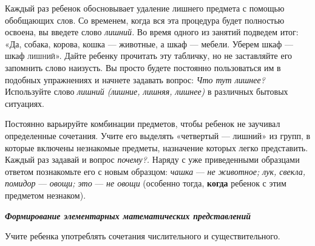 \documentclass[a5paper]{book}
\renewcommand{\emph}[1]{\textit{#1}}
\begin{document}
Каждый раз ребенок обосновывает удаление лишнего предмета с помощью
обобщающих слов. Со временем, когда вся эта процедура будет полностью
освоена, вы введете слово \emph{лишний.} Во время одного из занятий
подведем итог: «Да, собака, корова, кошка --- животные, а шкаф ---
мебели. Уберем шкаф --- шкаф \textsc{лишний».} Дайте ребенку прочитать
эту табличку, но не заставляйте его запомнить слово наизусть. Вы просто
будете постоянно пользоваться им в подобных упражнениях и начнете
задавать вопрос: \emph{Что тут лишнее?} Используйте слово \emph{лишний
(лишние, лишняя, лишнее)} в различных бытовых ситуациях.

Постоянно варьируйте комбинации предметов, чтобы ребенок не заучивал
определенные сочетания. Учите его выделять «четвертый --- лишний» из
групп, в которые включены незнакомые предметы, назначение которых легко
представить. Каждый раз задавай и вопрос \emph{почему?.} Наряду с уже
приведенными образцами ответом познакомьте его с новым образцом:
\emph{чашка} --- \emph{не животное; лук, свекла, помидор} ---
\emph{овощи; это} --- \emph{не овощи} (особенно тогда, \textbf{когда}
ребенок с этим предметом незнаком).

\emph{\textbf{Формирование элементарных математических представлений}}

Учите ребенка употреблять сочетания числительного и существительного.
\end{document}
